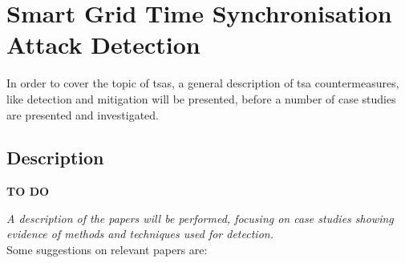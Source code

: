 





  

\chapter[Smart Grid TSA Detection]{Smart Grid Time Synchronisation Attack Detection}





In order to cover the topic of \acrfull{tsa}s,  a general description of \acrshort{tsa} countermeasures, like detection and mitigation will be presented, before a number of case studies are presented and investigated.  


\section{Description}

   

\textbf{TO DO}

\textit{A description of the papers will be performed, focusing on case studies showing evidence of methods and techniques used for detection.}  \\ 


Some suggestions on relevant papers are:

